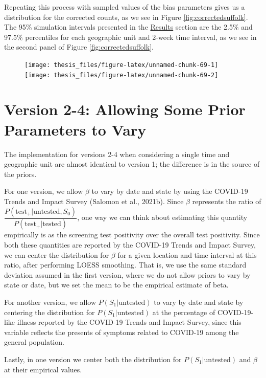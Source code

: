 \documentclass[12pt,twoside]{smiththesis}
\begin{document}
Repeating this process with sampled values of the bias parameters gives us a distribution for the corrected counts, as we see in Figure \ref{fig:correctedsuffolk}. The 95\% simulation intervals presented in the \protect\hyperlink{res}{Results} section are the 2.5\% and 97.5\% percentiles for each geographic unit and 2-week time interval, as we see in the second panel of Figure \ref{fig:correctedsuffolk}.
\begin{figure}
\texttt{[image: thesis\_files/figure-latex/unnamed-chunk-69-1]} \texttt{[image: thesis\_files/figure-latex/unnamed-chunk-69-2]} \caption{\label{fig:correctedsuffolk}}\label{fig:unnamed-chunk-69}
\end{figure}
\hypertarget{version-2-4-allowing-some-prior-parameters-to-vary}{%
\section{Version 2-4: Allowing Some Prior Parameters to Vary}\label{version-2-4-allowing-some-prior-parameters-to-vary}}

The implementation for versions 2-4 when considering a single time and geographic unit are almost identical to version 1; the difference is in the source of the priors.

For one version, we allow \(\beta\) to vary by date and state by using the COVID-19 Trends and Impact Survey (Salomon et al., 2021b). Since \(\beta\) represents the ratio of \(\dfrac{P(\text{test}_+|\text{untested},S_0)}{P(\text{test}_+|\text{tested})}\), one way we can think about estimating this quantity empirically is as the screening test positivity over the overall test positivity. Since both these quantities are reported by the COVID-19 Trends and Impact Survey, we can center the distribution for \(\beta\) for a given location and time interval at this ratio, after performing LOESS smoothing. That is, we use the same standard deviation assumed in the first version, where we do not allow priors to vary by state or date, but we set the mean to be the empirical estimate of beta.

For another version, we allow \(P(S_1|\text{untested})\) to vary by date and state by centering the distribution for \(P(S_1|\text{untested})\) at the percentage of COVID-19-like illness reported by the COVID-19 Trends and Impact Survey, since this variable reflects the presents of symptoms related to COVID-19 among the general population.

Lastly, in one version we center both the distribution for \(P(S_1|\text{untested})\) and \(\beta\) at their empirical values.
\end{document}
